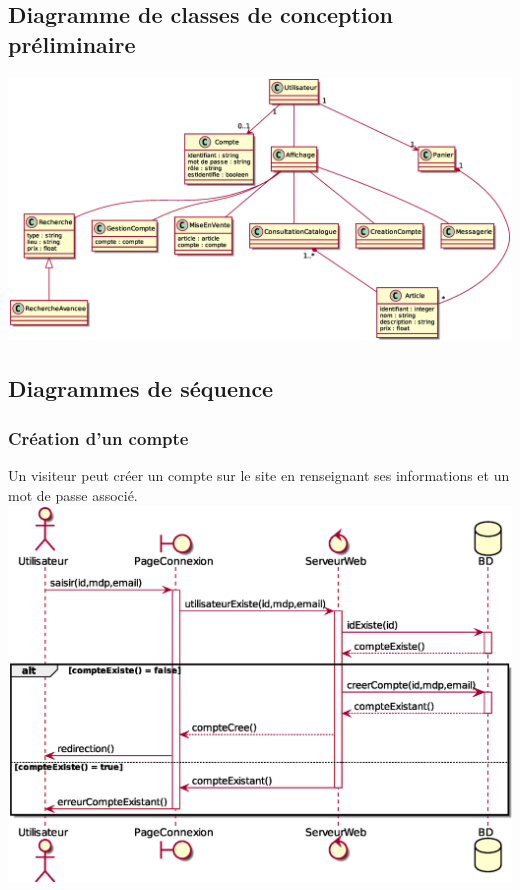 \subsection{Diagramme de classes de conception préliminaire}
\includegraphics[width=17cm]{Images/DCCP} \\

\newpage
\subsection{Diagrammes de séquence}

\subsubsection{Création d'un compte}
Un visiteur peut créer un compte sur le site en renseignant ses informations et un mot de passe associé.\\
\includegraphics[width=15cm]{Images/DSEQ_CreationCompte} \\
\newpage
